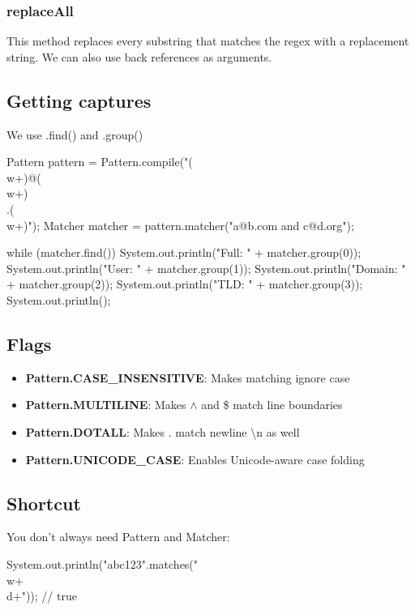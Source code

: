 \documentclass{report}
\begin{document}
    \bigbreak \noindent 
    \subsubsection{replaceAll}
    \bigbreak \noindent 
    This method replaces every substring that matches the regex with a replacement string. We can also use back references as arguments.
    \bigbreak \noindent 

    \bigbreak \noindent 
    \subsection{Getting captures}
    \bigbreak \noindent 
    We use .find() and .group()
    \bigbreak \noindent 
    \begin{javacode}
        Pattern pattern = Pattern.compile("(\\w+)@(\\w+)\\.(\\w+)");
        Matcher matcher = pattern.matcher("a@b.com and c@d.org");

        while (matcher.find()) {
            System.out.println("Full: " + matcher.group(0));
            System.out.println("User: " + matcher.group(1));
            System.out.println("Domain: " + matcher.group(2));
            System.out.println("TLD: " + matcher.group(3));
            System.out.println();
        }
    \end{javacode}

    \bigbreak \noindent 
    \subsection{Flags}
    \begin{itemize}
        \item \textbf{Pattern.CASE\_INSENSITIVE}:	Makes matching ignore case
        \item \textbf{Pattern.MULTILINE}:	Makes $\land$ and \$ match line boundaries
        \item \textbf{Pattern.DOTALL}:	Makes . match newline \textbackslash n as well
        \item \textbf{Pattern.UNICODE\_CASE}:	Enables Unicode-aware case folding
    \end{itemize}

    \bigbreak \noindent 
    \subsection{Shortcut}
    \bigbreak \noindent 
    You don’t always need Pattern and Matcher:
    \bigbreak \noindent 
    \begin{javacode}
    System.out.println("abc123".matches("\\w+\\d+")); // true
    \end{javacode}
\end{document}
